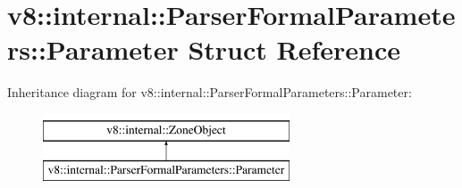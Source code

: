 \hypertarget{structv8_1_1internal_1_1ParserFormalParameters_1_1Parameter}{}\section{v8\+:\+:internal\+:\+:Parser\+Formal\+Parameters\+:\+:Parameter Struct Reference}
\label{structv8_1_1internal_1_1ParserFormalParameters_1_1Parameter}
Inheritance diagram for v8\+:\+:internal\+:\+:Parser\+Formal\+Parameters\+:\+:Parameter\+:\begin{figure}[H]
\begin{center}
\leavevmode
\includegraphics[height=2.000000cm]{structv8_1_1internal_1_1ParserFormalParameters_1_1Parameter}
\end{center}
\end{figure}
